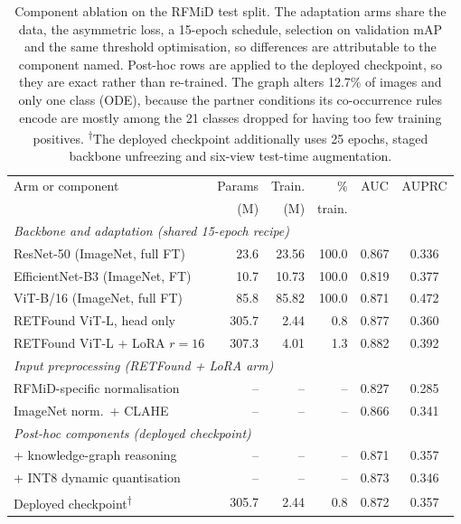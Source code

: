 \begin{table}[!t]
\centering
\caption{Component ablation on the RFMiD test split. The adaptation arms share the data, the
asymmetric loss, a 15-epoch schedule, selection on validation mAP and the same threshold
optimisation, so differences are attributable to the component named. Post-hoc rows are applied
to the deployed checkpoint, so they are exact rather than re-trained. The graph alters 12.7\% of images and only one class (ODE), because the partner conditions its co-occurrence rules encode are mostly among the 21 classes dropped for having too few training positives.
\textsuperscript{$\dagger$}The deployed checkpoint additionally uses 25 epochs, staged backbone
unfreezing and six-view test-time augmentation.}
\label{tab:ablation}
\scriptsize
\setlength{\tabcolsep}{2.4pt}
\begin{tabular}{lrrrcc}
\toprule
Arm or component & Params & Train. & \% & AUC & AUPRC \\
 & (M) & (M) & train. & & \\
\midrule
\multicolumn{6}{l}{\emph{Backbone and adaptation (shared 15-epoch recipe)}} \\
\quad ResNet-50 (ImageNet, full FT) & 23.6 & 23.56 & 100.0 & 0.867 & 0.336 \\
\quad EfficientNet-B3 (ImageNet, FT) & 10.7 & 10.73 & 100.0 & 0.819 & 0.377 \\
\quad ViT-B/16 (ImageNet, full FT) & 85.8 & 85.82 & 100.0 & 0.871 & 0.472 \\
\quad RETFound ViT-L, head only & 305.7 & 2.44 & 0.8 & 0.877 & 0.360 \\
\quad RETFound ViT-L + LoRA $r{=}16$ & 307.3 & 4.01 & 1.3 & 0.882 & 0.392 \\
\multicolumn{6}{l}{\emph{Input preprocessing (RETFound + LoRA arm)}} \\
\quad RFMiD-specific normalisation & -- & -- & -- & 0.827 & 0.285 \\
\quad ImageNet norm.\ + CLAHE & -- & -- & -- & 0.866 & 0.341 \\
\multicolumn{6}{l}{\emph{Post-hoc components (deployed checkpoint)}} \\
\quad + knowledge-graph reasoning & -- & -- & -- & 0.871 & 0.357 \\
\quad + INT8 dynamic quantisation & -- & -- & -- & 0.873 & 0.346 \\
\midrule
Deployed checkpoint\textsuperscript{$\dagger$} & 305.7 & 2.44 & 0.8 & 0.872 & 0.357 \\
\bottomrule
\end{tabular}
\end{table}
